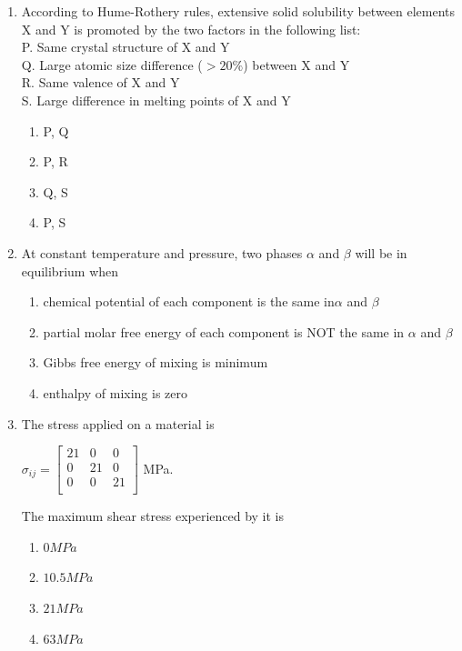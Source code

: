 \documentclass[journal]{IEEEtran}
\theoremstyle{remark}
\begin{document}
\begin{enumerate}
\item According to Hume-Rothery rules, extensive solid solubility between elements X and Y is promoted by 
the two factors in the following list:\hfill{}\\
P. Same crystal structure of X and Y\\
Q. Large atomic size difference ($>20\%$) between X and Y\\
R. Same valence of X and Y\\
S. Large difference in melting points of X and Y\\
\begin{multicols}{4}
\begin{enumerate}
\item  P, Q
\item  P, R
\item Q, S
\item P, S
\end{enumerate}
\end{multicols}

\item At constant temperature and pressure, two phases $\alpha$ and $\beta$ will be in equilibrium when\hfill{}\\
\begin{enumerate}
\item chemical potential of each component is the same in$\alpha$  and $\beta$
\item partial molar free energy of each component is NOT the same in $\alpha$  and $\beta$
\item Gibbs free energy of mixing is minimum
\item  enthalpy of mixing is zero
\end{enumerate}

	\item  The stress applied on a material is
    \hfill{}\\
    \begin{center}
$\sigma_{ij} = 
\begin{bmatrix}
    21&0&0\\
    0&21&0\\
    0&0&21\\
\end{bmatrix}$ MPa.\\
 \end{center}
The maximum shear stress experienced by it is
\begin{multicols}{4}
\begin{enumerate}
\item  $0 MPa$
\item  $10.5 MPa$
\item  $21 MPa$
\item  $63 MPa$
\end{enumerate}
\end{multicols}


\end{enumerate}
\end{document}
